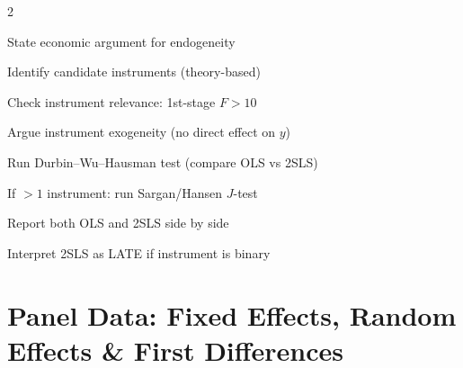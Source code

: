 \documentclass[10pt,a4paper]{article}
\begin{document}
\begin{tcolorbox}[checklist]
\begin{multicols}{2}
\begin{checklist}
  \item State economic argument for endogeneity
  \item Identify candidate instruments (theory-based)
  \item Check instrument relevance: 1st-stage $F > 10$
  \item Argue instrument exogeneity (no direct effect on $y$)
  \item Run Durbin--Wu--Hausman test (compare OLS vs 2SLS)
  \item If $>1$ instrument: run Sargan/Hansen $J$-test
  \item Report both OLS and 2SLS side by side
  \item Interpret 2SLS as LATE if instrument is binary
\end{checklist}
\end{multicols}
\end{tcolorbox}

\newpage

\section{Panel Data: Fixed Effects, Random Effects \& First Differences}
\end{document}
